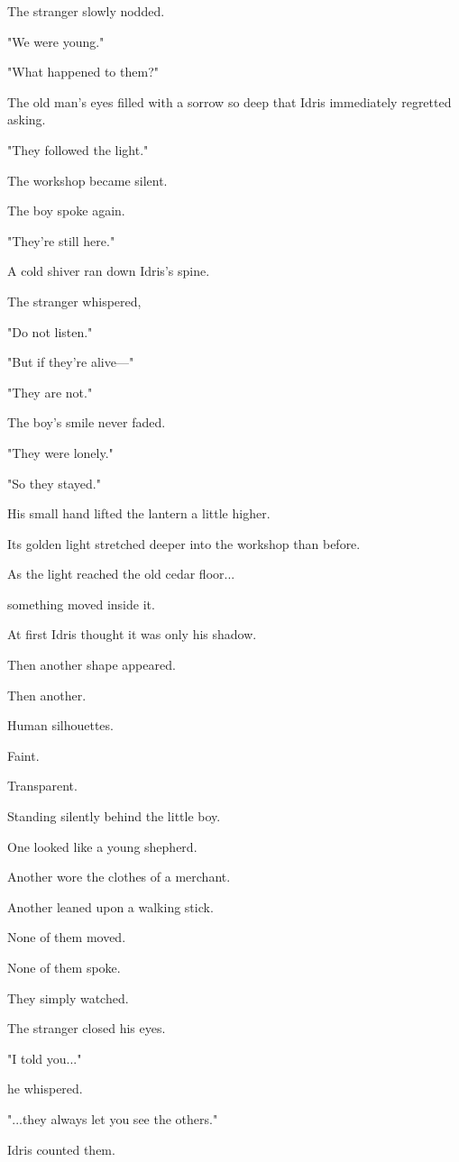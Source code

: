 \documentclass[12pt,openany]{book}
\begin{document}
The stranger slowly nodded.

"We were young."

"What happened to them?"

The old man's eyes filled with a sorrow so deep that Idris immediately regretted asking.

"They followed the light."

The workshop became silent.

The boy spoke again.

"They're still here."

A cold shiver ran down Idris's spine.

The stranger whispered,

"Do not listen."

"But if they're alive—"

"They are not."

The boy's smile never faded.

"They were lonely."

"So they stayed."

His small hand lifted the lantern a little higher.

Its golden light stretched deeper into the workshop than before.

As the light reached the old cedar floor...

something moved inside it.

At first Idris thought it was only his shadow.

Then another shape appeared.

Then another.

Human silhouettes.

Faint.

Transparent.

Standing silently behind the little boy.

One looked like a young shepherd.

Another wore the clothes of a merchant.

Another leaned upon a walking stick.

None of them moved.

None of them spoke.

They simply watched.

The stranger closed his eyes.

"I told you..."

he whispered.

"...they always let you see the others."

Idris counted them.
\end{document}
